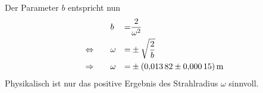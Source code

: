 %
Der Parameter $b$ entspricht nun
\begin{align*}
                  &&&&&      b &=&  \frac{2}{\omega^2} \\
  \Leftrightarrow &&&&& \omega &=& \pm \sqrt{\frac{2}{b}} \\
  \Rightarrow      &&&&& \omega &=& \pm \SI{ 0.01382 \pm 0.00015 }{m}\\
\end{align*}
Physikalisch ist nur das positive Ergebnis des Strahlradius $\omega$ sinnvoll.
%
\FloatBarrier

